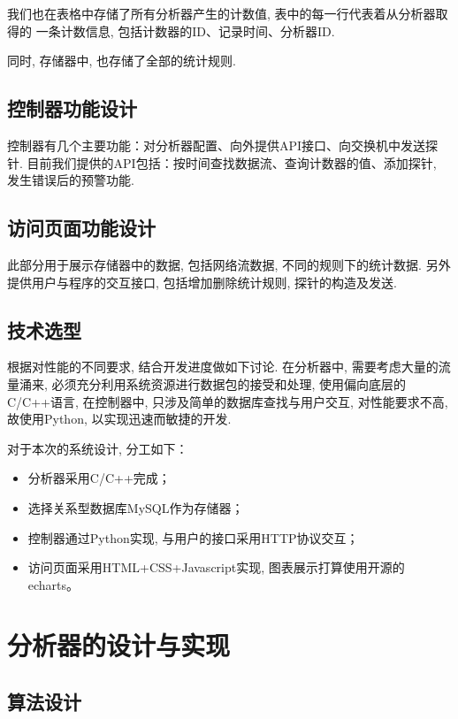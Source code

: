 我们也在表格中存储了所有分析器产生的计数值, 表中的每一行代表着从分析器取得的
一条计数信息, 包括计数器的ID、记录时间、分析器ID.

同时, 存储器中, 也存储了全部的统计规则.

\section{控制器功能设计}

控制器有几个主要功能：对分析器配置、向外提供API接口、向交换机中发送探针.
目前我们提供的API包括：按时间查找数据流、查询计数器的值、添加探针,
发生错误后的预警功能.

\section{访问页面功能设计}

此部分用于展示存储器中的数据, 包括网络流数据, 不同的规则下的统计数据.
另外提供用户与程序的交互接口, 包括增加删除统计规则, 探针的构造及发送.

\section{技术选型}

根据对性能的不同要求, 结合开发进度做如下讨论. 在分析器中,
需要考虑大量的流量涌来, 必须充分利用系统资源进行数据包的接受和处理,
使用偏向底层的C/C++语言, 在控制器中, 只涉及简单的数据库查找与用户交互,
对性能要求不高, 故使用Python, 以实现迅速而敏捷的开发.

对于本次的系统设计, 分工如下：

\begin{itemize}
\item
  分析器采用C/C++完成；
\item
  选择关系型数据库MySQL作为存储器；
\item
  控制器通过Python实现, 与用户的接口采用HTTP协议交互；
\item
  访问页面采用HTML+CSS+Javascript实现, 图表展示打算使用开源的echarts。
\end{itemize}

\chapter{分析器的设计与实现}

\section{算法设计}
\label{sec:分析器主要算法说明}

